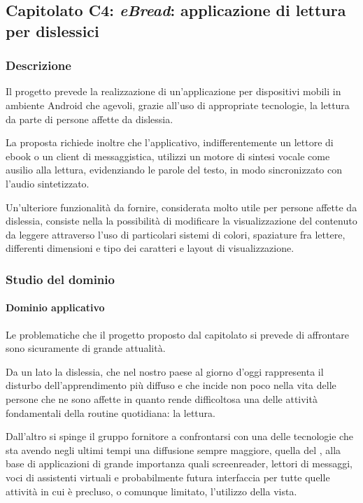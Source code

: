 	\subsection{Capitolato C4: \emph{eBread}: applicazione di lettura per dislessici}
		\subsubsection{Descrizione}
		Il progetto prevede la realizzazione di un'applicazione per dispositivi mobili in ambiente Android che agevoli, grazie all'uso di appropriate tecnologie, la lettura da parte di persone affette da dislessia.

		La proposta richiede inoltre che l'applicativo, indifferentemente un lettore di ebook o un client di messaggistica, utilizzi un motore di sintesi vocale come ausilio alla lettura, evidenziando le parole del testo, in modo sincronizzato con l'audio sintetizzato. 

		Un'ulteriore funzionalità da fornire, considerata molto utile per persone affette da dislessia, consiste nella la possibilità di modificare la visualizzazione del contenuto da leggere attraverso l'uso di particolari sistemi di colori, spaziature fra lettere, differenti dimensioni 
		e tipo dei caratteri e layout di visualizzazione.
		\subsubsection{Studio del dominio}
			\paragraph{Dominio applicativo}
			Le problematiche che il progetto proposto dal capitolato si prevede di affrontare sono sicuramente di grande attualità.

			Da un lato la dislessia, che nel nostro paese al giorno d'oggi rappresenta il disturbo dell'apprendimento più diffuso e che incide non poco nella vita delle persone che ne sono affette in quanto rende difficoltosa una delle attività fondamentali della routine quotidiana: la lettura. 

			Dall'altro si spinge il gruppo fornitore a confrontarsi con una delle tecnologie che sta avendo negli ultimi tempi una diffusione sempre maggiore, quella del , alla base di applicazioni di grande importanza quali screenreader, lettori di messaggi, voci di assistenti virtuali e probabilmente futura interfaccia per tutte quelle attività in cui è precluso, o comunque limitato, l'utilizzo della vista.
